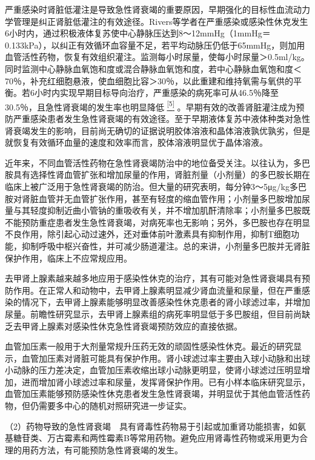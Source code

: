严重感染时肾脏低灌注是导致急性肾衰竭的重要原因，早期强化的目标性血流动力学管理是纠正肾脏低灌注的有效途径。Rivers等学者在严重感染或感染性休克发生6小时内，通过积极液体复苏使中心静脉压达到8～12mmHg（1mmHg＝0.133kPa），以纠正有效循环血容量不足，若平均动脉压仍低于65mmHg，则加用血管活性药物，恢复有效组织灌注。监测每小时尿量，使每小时尿量＞0.5ml/kg。同时监测中心静脉血氧饱和度或混合静脉血氧饱和度，若中心静脉血氧饱和度＜70％，补充红细胞悬液，使血细胞比容＞30％，以此重建和维持氧需与氧供的平衡。若6小时内实现早期目标导向治疗，严重感染的病死率可从46.5％降至30.5％，且急性肾衰竭的发生率也明显降低
\protect\hyperlink{text00017.htmlux5cux23ch5-16}{\textsuperscript{{[}5{]}}}
。早期有效的改善肾脏灌注成为预防严重感染患者发生急性肾衰竭的有效途径。至于早期液体复苏中液体种类对急性肾衰竭发生的影响，目前尚无确切的证据说明胶体溶液和晶体溶液孰优孰劣，但是就恢复有效循环血量的速度和效率而言，胶体溶液明显优于晶体溶液。

近年来，不同血管活性药物在急性肾衰竭防治中的地位备受关注。以往认为，多巴胺具有选择性肾血管扩张和增加尿量的作用，肾脏剂量（小剂量）的多巴胺长期在临床上被广泛用于急性肾衰竭的防治。但大量的研究表明，每分钟3～5μg/kg多巴胺对肾脏血管并无血管扩张作用，甚至有轻度的缩血管作用；小剂量多巴胺增加尿量与其轻度抑制近曲小管钠的重吸收有关，并不增加肌酐清除率；小剂量多巴胺既不能预防重症患者发生急性肾衰竭，对病死率也无影响；另外，多巴胺也存在明显不良作用，除引起心动过速外，还对垂体前叶激素具有抑制作用，抑制T细胞功能，抑制呼吸中枢兴奋性，并可减少肠道灌注。总的来讲，小剂量多巴胺并无肾脏保护作用，临床上不应常规应用。

去甲肾上腺素越来越多地应用于感染性休克的治疗，其有可能对急性肾衰竭具有预防作用。在正常人和动物中，去甲肾上腺素明显减少肾血流量和尿量，但在严重感染的情况下，去甲肾上腺素能够明显改善感染性休克患者的肾小球滤过率，并增加尿量。前瞻性研究显示，去甲肾上腺素组的病死率明显低于多巴胺组，但目前尚缺乏去甲肾上腺素对感染性休克急性肾衰竭预防效应的直接依据。

血管加压素一般用于大剂量常规升压药无效的顽固性感染性休克。最近的研究显示，血管加压素对肾脏可能具有保护作用。肾小球滤过率主要由入球小动脉和出球小动脉的压力差决定，血管加压素收缩出球小动脉更明显，使肾小球滤过压明显增加，进而增加肾小球滤过率和尿量，发挥肾保护作用。已有小样本临床研究显示，血管加压素能够预防感染性休克患者发生急性肾衰竭，并明显优于其他血管活性药物，但仍需要多中心的随机对照研究进一步证实。

（2）药物导致的急性肾衰竭　具有肾毒性药物易于引起或加重肾功能损害，如氨基糖苷类、万古霉素和两性霉素B等常用药物。避免应用肾毒性药物或采用更为合理的用药方法，有可能预防急性肾衰竭的发生。

